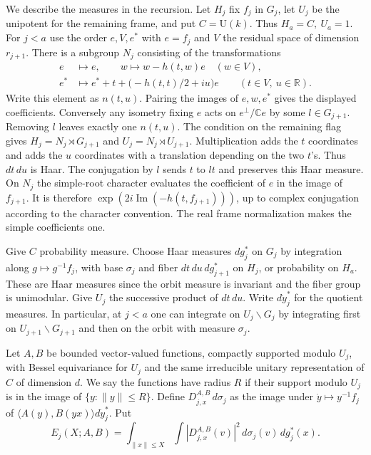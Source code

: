 \documentclass[a4paper,11pt]{article}
\theoremstyle{definition}
\theoremstyle{remark}
\numberwithin{equation}{section}
\begin{document}
We describe the measures in the recursion. Let \(H_j\) fix
\(f_j\) in \(G_j\), let \(U_j\) be the unipotent for the remaining
frame, and put \(C=\mathrm U(k)\). Thus \(H_a=C,\ U_a=1\).
For \(j<a\) use the order \(e,V,e^*\) with \(e=f_j\) and
\(V\) the residual space of dimension \(r_{j+1}\). There is a
subgroup \(N_j\) consisting of the transformations
\[
 \begin{split}
 e&\longmapsto e,\qquad w\longmapsto w-h(t,w)e\quad(w\in V),\\
 e^*&\longmapsto e^*+t+\big(-h(t,t)/2+i u\big)e
                    \qquad(t\in V,\ u\in\mathbb R).
 \end{split}
\]
Write this element as \(n(t,u)\). Pairing the images of
\(e,w,e^*\) gives the displayed coefficients. Conversely any
isometry fixing \(e\) acts on \(e^\perp/\mathbb C e\) by some
\(l\in G_{j+1}\). Removing \(l\) leaves exactly one \(n(t,u)\).
The condition on the remaining flag gives
\(H_j=N_j\rtimes G_{j+1}\) and \(U_j=N_j\rtimes U_{j+1}\).
Multiplication adds the \(t\) coordinates and adds the \(u\)
coordinates with a translation depending on the two \(t\)'s.
Thus \(dt\,du\) is Haar. The conjugation by \(l\) sends \(t\)
to \(lt\) and preserves this Haar measure. On \(N_j\) the
simple-root character evaluates the coefficient of \(e\) in
the image of \(f_{j+1}\). It is therefore
\(\exp(2i\operatorname{Im}(-h(t,f_{j+1})))\), up to complex
conjugation according to the character convention. The
real frame normalization makes the simple coefficients one.

Give \(C\) probability measure. Choose Haar measures \(dg_j^*\)
on \(G_j\) by integration along \(g\mapsto g^{-1}f_j\), with
base \(\sigma_j\) and fiber \(dt\,du\,dg_{j+1}^*\) on \(H_j\),
or probability on \(H_a\). These are Haar measures since the
orbit measure is invariant and the fiber group is unimodular.
Give \(U_j\) the successive product of \(dt\,du\). Write
\(d\dot y_j^*\) for the quotient measures. In particular,
at \(j<a\) one can integrate on \(U_j\backslash G_j\) by
integrating first on \(U_{j+1}\backslash G_{j+1}\) and then
on the orbit with measure \(\sigma_j\).

Let \(A,B\) be bounded vector-valued functions, compactly
supported modulo \(U_j\), with Bessel equivariance for \(U_j\)
and the same irreducible unitary representation of \(C\) of
dimension \(d\). We say the functions have radius \(R\) if
their support modulo \(U_j\) is in the image of
\(\{y:\|y\|\le R\}\). Define \(D_{j,x}^{A,B}\,d\sigma_j\) as
the image under \(\dot y\mapsto y^{-1}f_j\) of
\(\langle A(y),B(yx)\rangle d\dot y_j^*\). Put
\[
 E_j(X;A,B)=\int_{\|x\|\le X}\int |D_{j,x}^{A,B}(v)|^2\,
                      d\sigma_j(v)\,dg_j^*(x).
\]
\end{document}
